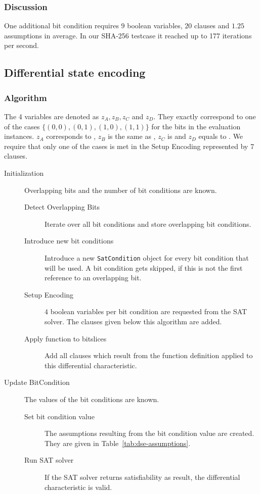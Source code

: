 \subsubsection{Discussion}
\label{sec:reduced-encoding-discussion}
%
One additional bit condition requires $9$ boolean variables, $20$ clauses and $1.25$ assumptions in average.
In our SHA-256 testcase it reached up to 177 iterations per second.

\subsection{Differential state encoding}
\label{sec:encoding:dse}
%
\subsubsection{Algorithm}
\label{sec:encoding:dse-algorithm}
%
The 4 variables are denoted as $z_A, z_B, z_C$ and $z_D$. They exactly correspond to one of the cases $\{(0, 0), (0, 1), (1, 0), (1, 1)\}$ for the bits in the evaluation instances. $z_A$ corresponds to , $z_B$ is the same as , $z_C$ is  and $z_D$ equals to . We require that only one of the cases is met in the Setup Encoding represented by 7 clauses.
%
\begin{description}
  \item[Initialization] Overlapping bits and the number of bit conditions are known.
    \begin{description}
      \item[Detect Overlapping Bits] Iterate over all bit conditions and store overlapping bit conditions.
      \item[Introduce new bit conditions] Introduce a new \texttt{SatCondition} object for every bit condition that will be used. A bit condition gets skipped, if this is not the first reference to an overlapping bit.
      \item[Setup Encoding] $4$ boolean variables per bit condition are requested from the SAT solver. The clauses given below this algorithm are added.
      \item[Apply function to bitslices] Add all clauses which result from the function definition applied to this differential characteristic.
    \end{description}
  \item[Update BitCondition] The values of the bit conditions are known.
    \begin{description}
      \item[Set bit condition value] The assumptions resulting from the bit condition value are created. They are given in Table~\ref{tab:dse-assumptions}.
      \item[Run SAT solver] If the SAT solver returns satisfiability as result, the differential characteristic is valid.
    \end{description}
\end{description}

